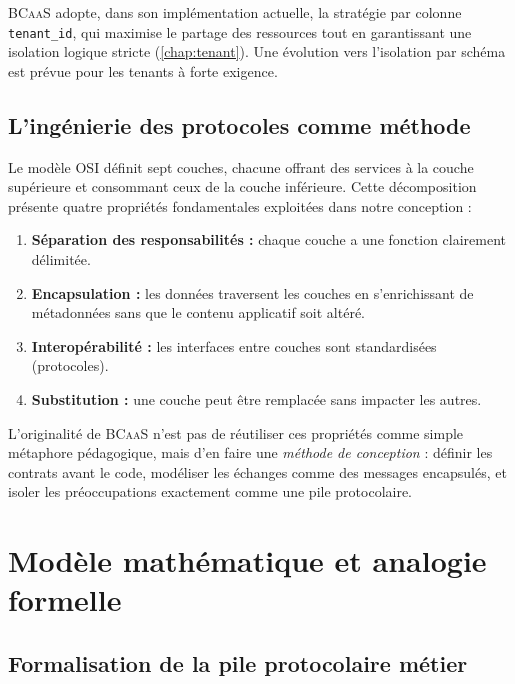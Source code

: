 \documentclass[12pt,a4paper]{report}
\theoremstyle{definition}
\theoremstyle{remark}
\newcommand{\bcaas}{\textsc{BCaaS}}
\newcommand{\osi}{\textsc{OSI}}
\begin{document}
\bcaas{} adopte, dans son implémentation actuelle, la stratégie par colonne \texttt{tenant\_id}, qui maximise le partage des ressources tout en garantissant une isolation logique stricte (\cref{chap:tenant}). Une évolution vers l'isolation par schéma est prévue pour les tenants à forte exigence.

\section{L'ingénierie des protocoles comme méthode}

Le modèle \osi{} définit sept couches, chacune offrant des services à la couche supérieure et consommant ceux de la couche inférieure. Cette décomposition présente quatre propriétés fondamentales exploitées dans notre conception :

\begin{enumerate}
	\item \textbf{Séparation des responsabilités :} chaque couche a une fonction clairement délimitée.
	\item \textbf{Encapsulation :} les données traversent les couches en s'enrichissant de métadonnées sans que le contenu applicatif soit altéré.
	\item \textbf{Interopérabilité :} les interfaces entre couches sont standardisées (protocoles).
	\item \textbf{Substitution :} une couche peut être remplacée sans impacter les autres.
\end{enumerate}

L'originalité de \bcaas{} n'est pas de réutiliser ces propriétés comme simple métaphore pédagogique, mais d'en faire une \emph{méthode de conception} : définir les contrats avant le code, modéliser les échanges comme des messages encapsulés, et isoler les préoccupations exactement comme une pile protocolaire.

\chapter{Modèle mathématique et analogie formelle}
\label{chap:analogie}

\section{Formalisation de la pile protocolaire métier}
\end{document}
